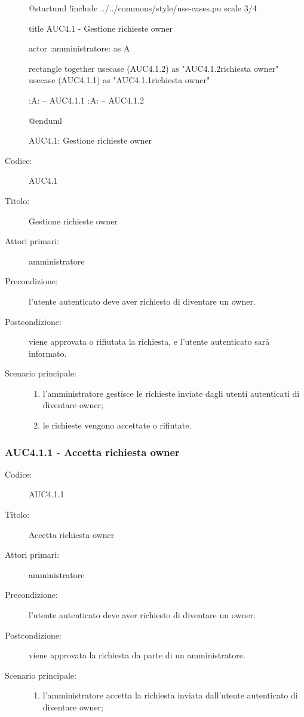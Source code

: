 \documentclass[casi-duso]{subfiles}
\begin{document}
\begin{figure}[h!] 
  \centering 
  \begin{plantuml}
  @startuml
  !include ../../commons/style/use-cases.pu
  scale 3/4

  title AUC4.1 - Gestione richieste owner

  actor :amministratore: as A

  rectangle {
    together {
      usecase (AUC4.1.2) as "AUC4.1.2\nRifiuta richiesta owner"
      usecase (AUC4.1.1) as "AUC4.1.1\nAccetta richiesta owner"
    }
  }

  :A: -- AUC4.1.1
  :A: -- AUC4.1.2

  @enduml
  \end{plantuml} 
  \caption{AUC4.1: Gestione richieste owner} 
  \label{fig:auc4_1} 
\end{figure}

\begin{description}
  \item[Codice:] AUC4.1
  \item[Titolo:] Gestione richieste owner
  \item[Attori primari:] amministratore
  \item[Precondizione:] l'utente autenticato deve aver richiesto di diventare un owner.
  \item[Postcondizione:] viene approvata o rifiutata la richiesta, e l'utente autenticato sarà informato.
  \item[Scenario principale:] 
  \begin{enumerate}
    \item l'amministratore gestisce le richieste inviate dagli utenti autenticati di diventare owner;
    \item le richieste vengono accettate o rifiutate.
  \end{enumerate}
\end{description}

\subsubsection{AUC4.1.1 - Accetta richiesta owner}%
\label{subsub:AUC4.1.1}
\begin{description}
  \item[Codice:] AUC4.1.1
  \item[Titolo:] Accetta richiesta owner
  \item[Attori primari:] amministratore
  \item[Precondizione:] l'utente autenticato deve aver richiesto di diventare un owner.
  \item[Postcondizione:] viene approvata la richiesta da parte di un amministratore.
  \item[Scenario principale:]
  \begin{enumerate}
    \item l'amministratore accetta la richiesta inviata dall'utente autenticato di diventare owner;
  \end{enumerate}
\end{description}
\end{document}
